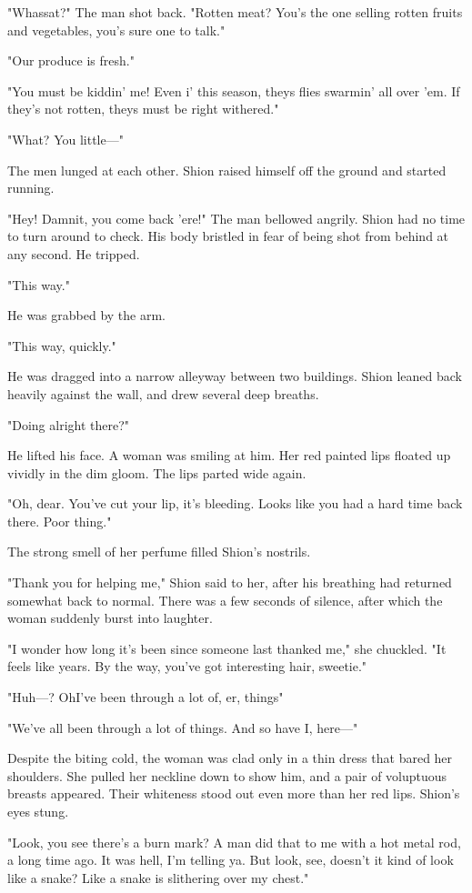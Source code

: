 "Whassat?" The man shot back. "Rotten meat? You's the one selling rotten
fruits and vegetables, you's sure one to talk."

"Our produce is fresh."

"You must be kiddin' me! Even i' this season, theys flies swarmin' all
over 'em. If they's not rotten, theys must be right withered."

"What? You little---"

The men lunged at each other. Shion raised himself off the ground and
started running.

"Hey! Damnit, you come back 'ere!" The man bellowed angrily. Shion had
no time to turn around to check. His body bristled in fear of being shot
from behind at any second. He tripped.

"This way."

He was grabbed by the arm.

"This way, quickly."

He was dragged into a narrow alleyway between two buildings. Shion
leaned back heavily against the wall, and drew several deep breaths.

"Doing alright there?"

He lifted his face. A woman was smiling at him. Her red painted lips
floated up vividly in the dim gloom. The lips parted wide again.

"Oh, dear. You've cut your lip, it's bleeding. Looks like you had a hard
time back there. Poor thing."

The strong smell of her perfume filled Shion's nostrils.

"Thank you for helping me," Shion said to her, after his breathing had
returned somewhat back to normal. There was a few seconds of silence,
after which the woman suddenly burst into laughter.

"I wonder how long it's been since someone last thanked me," she
chuckled. "It feels like years. By the way, you've got interesting hair,
sweetie."

"Huh---? Oh\el I've been through a lot of, er, things\el "

"We've all been through a lot of things. And so have I, here---"

Despite the biting cold, the woman was clad only in a thin dress that
bared her shoulders. She pulled her neckline down to show him, and a
pair of voluptuous breasts appeared. Their whiteness stood out even more
than her red lips. Shion's eyes stung.

"Look, you see there's a burn mark? A man did that to me with a hot
metal rod, a long time ago. It was hell, I'm telling ya. But look, see,
doesn't it kind of look like a snake? Like a snake is slithering over my
chest."

